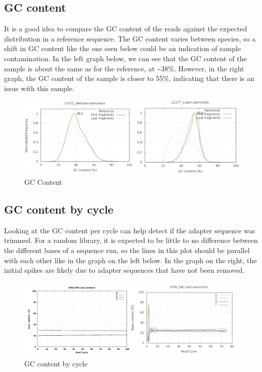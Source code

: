 \documentclass[11pt]{article}
\begin{document}
    \hypertarget{gc-content}{%
\subsection{GC content}\label{gc-content}}

It is a good idea to compare the GC content of the reads against the
expected distribution in a reference sequence. The GC content varies
between species, so a shift in GC content like the one seen below could
be an indication of sample contamination. In the left graph below, we
can see that the GC content of the sample is about the same as for the
reference, at \textasciitilde38\%. However, in the right graph, the GC
content of the sample is closer to 55\%, indicating that there is an
issue with this sample.

    \begin{figure}[!h]
\centering
\includegraphics{img/gc_bias.png}
\caption{GC Content}
\end{figure}

    \hypertarget{gc-content-by-cycle}{%
\subsection{GC content by cycle}\label{gc-content-by-cycle}}

Looking at the GC content per cycle can help detect if the adapter
sequence was trimmed. For a random library, it is expected to be little
to no difference between the different bases of a sequence run, so the
lines in this plot should be parallel with each other like in the graph
on the left below. In the graph on the right, the initial spikes are
likely due to adapter sequences that have not been removed.

    \begin{figure}[!h]
\centering
\includegraphics{img/acgt_per_cycle_comparison.png}
\caption{GC content by cycle}
\end{figure}
\end{document}
